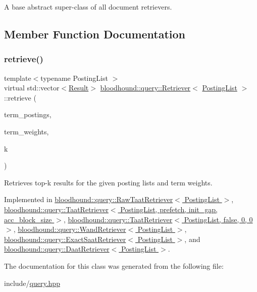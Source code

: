 A base abstract super-\/class of all document retrievers. 

\subsection{Member Function Documentation}
\mbox{\label{classbloodhound_1_1query_1_1Retriever_ae3c6a4628c5580e620c213b3dcd47c2b}} 
\subsubsection{\texorpdfstring{retrieve()}{retrieve()}}
{\footnotesize\ttfamily template$<$typename Posting\+List $>$ \\
virtual std\+::vector$<$\hyperlink{structbloodhound_1_1query_1_1Result}{Result}$>$ \hyperlink{classbloodhound_1_1query_1_1Retriever}{bloodhound\+::query\+::\+Retriever}$<$ \hyperlink{classbloodhound_1_1PostingList}{Posting\+List} $>$\+::retrieve (\begin{DoxyParamCaption}\item[{const std\+::vector$<$ \hyperlink{classbloodhound_1_1PostingList}{Posting\+List} $>$ \&}]{term\+\_\+postings,  }\item[{const std\+::vector$<$ \hyperlink{structbloodhound_1_1Score}{Score} $>$ \&}]{term\+\_\+weights,  }\item[{std\+::size\+\_\+t}]{k }\end{DoxyParamCaption})\hspace{0.3cm}{\ttfamily [pure virtual]}}



Retrieves top-\/k results for the given posting lists and term weights. 



Implemented in \hyperlink{classbloodhound_1_1query_1_1RawTaatRetriever_aafaaf842fdaef297a255e28766af2c0d}{bloodhound\+::query\+::\+Raw\+Taat\+Retriever$<$ Posting\+List $>$}, \hyperlink{classbloodhound_1_1query_1_1TaatRetriever_a58284f19458689021a083c07ea627485}{bloodhound\+::query\+::\+Taat\+Retriever$<$ Posting\+List, prefetch, init\+\_\+gap, acc\+\_\+block\+\_\+size $>$}, \hyperlink{classbloodhound_1_1query_1_1TaatRetriever_a58284f19458689021a083c07ea627485}{bloodhound\+::query\+::\+Taat\+Retriever$<$ Posting\+List, false, 0, 0 $>$}, \hyperlink{classbloodhound_1_1query_1_1WandRetriever_a5f3068bc363c16c5b7255a925ea5af8c}{bloodhound\+::query\+::\+Wand\+Retriever$<$ Posting\+List $>$}, \hyperlink{classbloodhound_1_1query_1_1ExactSaatRetriever_aced2763cc2a4c12838fef4a20759049e}{bloodhound\+::query\+::\+Exact\+Saat\+Retriever$<$ Posting\+List $>$}, and \hyperlink{classbloodhound_1_1query_1_1DaatRetriever_ab80b4867fc263827dc2fdbe0965a2e8c}{bloodhound\+::query\+::\+Daat\+Retriever$<$ Posting\+List $>$}.



The documentation for this class was generated from the following file\+:\begin{DoxyCompactItemize}
\item 
include/\hyperlink{query_8hpp}{query.\+hpp}\end{DoxyCompactItemize}
